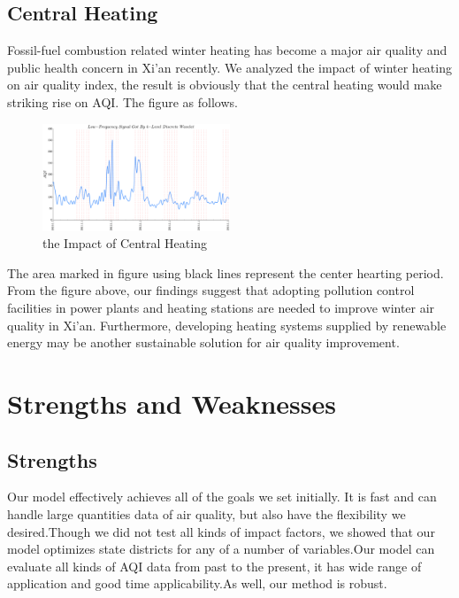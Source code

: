 \documentclass[a4paper,11pt]{article}
\begin{document}
\subsection{Central Heating}
\par Fossil-fuel combustion related winter heating has become a major air quality and public health concern in Xi'an recently. We analyzed the impact of winter heating on air quality index, the result is obviously that the central heating would make striking rise on AQI. The figure as follows.

\begin{figure}[h]%
\centering %
\includegraphics[width=0.50\textwidth]{./Pic/Trslowf.png}
\caption{the Impact of Central Heating}
\label{fig:Trslowf}       %
\end{figure}

\par The area marked in figure using black lines  represent the center hearting period. From the figure above, our findings suggest that adopting pollution control facilities in power plants and heating stations are needed to improve winter air quality in Xi'an. Furthermore, developing heating systems supplied by renewable energy may be another sustainable solution for air quality improvement.

\section{Strengths and Weaknesses}

\subsection{Strengths}
\par Our model effectively achieves all of the goals we set initially. It is fast and can handle large quantities data of air quality, but also have the flexibility we desired.Though we did not test all kinds of impact factors, we showed that our model optimizes state districts for any of a number of variables.Our model can evaluate all kinds of AQI data from past to the present, it has wide range of application and good time applicability.As well, our method is robust.
\end{document}
